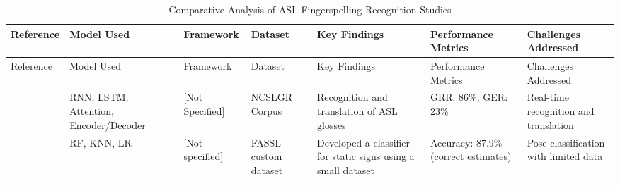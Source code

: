 \begin{longtable}{p{}p{}p{}p{}p{}p{}p{}} %
    \caption{Comparative Analysis of ASL Fingerspelling Recognition Studies}
    \label{table:asl-comparison}                                                                                                                                                                                                                                                                                                                                                                                                                                                 \\
    \toprule
    Reference                                          & Model Used                                                                                                            & Framework                & Dataset                        & Key Findings                                                                                    & Performance Metrics                                    & Challenges Addressed                                                     \\
    \midrule
    \endfirsthead
    \toprule
    Reference                                          & Model Used                                                                                                            & Framework                & Dataset                        & Key Findings                                                                                    & Performance Metrics                                    & Challenges Addressed                                                     \\
    \midrule
    \endhead
    \bottomrule
    \endfoot
    \endlastfoot
    \cite{skumarTimeSeriesNeural2018}                  & RNN, LSTM, Attention, Encoder/Decoder                                                                                 & [Not Specified]          & NCSLGR Corpus                  & Recognition and translation of ASL glosses                                                      & GRR: 86\%, GER: 23\%                                   & Real-time recognition and translation                                    \\

    \cite{weerasooriyaSinhalaFingerspellingSign2022}   & RF, KNN, LR                                                                                                           & [Not specified]          & FASSL custom dataset           & Developed a classifier for static signs using a small dataset                                   & Accuracy: 87.9\% (correct estimates)                   & Pose classification with limited data                                    \\


\end{longtable}
